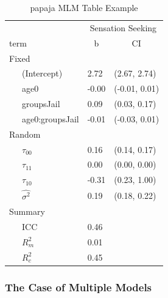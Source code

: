 \documentclass[]{article}
\begin{document}
\begin{table}[tbp]
\begin{center}
\begin{threeparttable}
\caption{\label{tab:unnamed-chunk-28}papaja MLM Table Example}
\begin{tabular}{lll}
\toprule
 & \multicolumn{2}{c}{Sensation Seeking} \\
\cmidrule(r){2-3}
term & \multicolumn{1}{c}{b} & \multicolumn{1}{c}{CI}\\
\midrule
Fixed &  & \\
\ \ \ (Intercept) & 2.72 & (2.67, 2.74)\\
\ \ \ age0 & -0.00 & (-0.01, 0.01)\\
\ \ \ groupsJail & 0.09 & (0.03, 0.17)\\
\ \ \ age0:groupsJail & -0.01 & (-0.03, 0.01)\\
Random &  & \\
\ \ \ $\tau_{00}$ & 0.16 & (0.14, 0.17)\\
\ \ \ $\tau_{11}$ & 0.00 & (0.00, 0.00)\\
\ \ \ $\tau_{10}$ & -0.31 & (0.23, 1.00)\\
\ \ \ $\hat{\sigma^2}$ & 0.19 & (0.18, 0.22)\\
Summary &  & \\
\ \ \ ICC & 0.46 & \\
\ \ \ $R^2_m$ & 0.01 & \\
\ \ \ $R^2_c$ & 0.45 & \\
\bottomrule
\end{tabular}
\end{threeparttable}
\end{center}
\end{table}

\normalsize

\subsubsection{The Case of Multiple
Models}\label{the-case-of-multiple-models}
\end{document}
